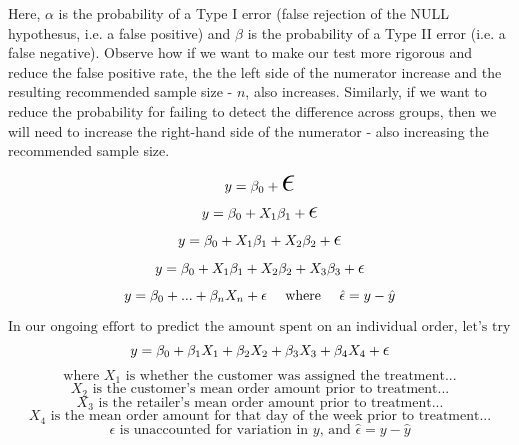 \documentclass[12pt]{article}
\begin{document}
Here, $\alpha$ is the probability of a Type I error (false rejection of the NULL hypothesus, i.e. a false positive) and $\beta$ is the probability of a Type II error (i.e. a false negative). Observe how if we want to make our test more rigorous and reduce the false positive rate, the the left side of the numerator increase and the resulting recommended sample size - $n$, also increases. Similarly, if we want to reduce the probability for failing to detect the difference across groups, then we will need to increase the right-hand side of the numerator - also increasing the recommended sample size.

\newpage
\[ y = \beta_0 + \mathlarger{\mathlarger{\mathlarger{\mathlarger{\mathlarger{\mathlarger{\epsilon}}}}}} \]
\[ y = \beta_0 + X_1\beta_1 + \mathlarger{\mathlarger{\mathlarger{\epsilon}}}\]
\[ y = \beta_0 + X_1\beta_1 + X_2\beta_2 + \mathlarger{\mathlarger{\epsilon}}\]
\[ y = \beta_0 + X_1\beta_1 + X_2\beta_2 + X_3\beta_3 +\mathlarger{\epsilon}\]
\[ y = \beta_0 + ... + \beta_nX_n + \epsilon \text{\phantom{aa} where \phantom{aa}} \hat{\epsilon} = y - \hat{y}\]

\newpage
\[\text{In our ongoing effort to predict the amount spent on an individual order, let's try the following...}\]
\[ y = \beta_0 + \beta_1X_1 + \beta_2X_2 + \beta_3X_3 + \beta_4X_4 +\mathlarger{\epsilon}\]
\[\text{where } X_1 \text{ is whether the customer was assigned the treatment...}\]
\[X_2 \text{ is the customer's mean order amount prior to treatment...}\]
\[X_3 \text{ is the retailer's mean order amount prior to treatment...}\]
\[X_4 \text{ is the mean order amount for that day of the week prior to treatment...}\]
\[\epsilon \text{ is unaccounted for variation in $y$, and } \hat{\epsilon} = y - \hat{y}\]



\newpage
\end{document}
